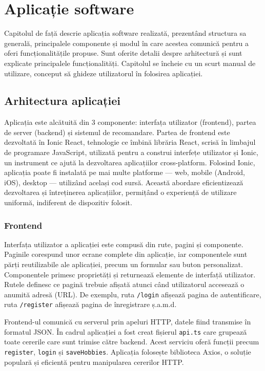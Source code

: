 \sloppy
\chapter{Aplicație software}
\label{chap:ch4}

\par
Capitolul de față descrie aplicația software realizată, prezentând structura sa generală, principalele componente și modul în care acestea comunică pentru a oferi funcționalitățile propuse.
Sunt oferite detalii despre arhitectură și sunt explicate principalele funcționalități. 
Capitolul se încheie cu un scurt manual de utilizare, conceput să ghideze utilizatorul în folosirea aplicației. 

\section{Arhitectura aplicației}
\label{sec:ch4sec1}

Aplicația este alcătuită din 3 componente: interfața utilizator (frontend), partea de server (backend) și sistemul de recomandare. 
Partea de frontend este dezvoltată în Ionic React\cite{ionicreactdocs}, tehnologie ce îmbină librăria React\cite{reactdocs}, scrisă în limbajul de programare JavaScript, 
utilizată pentru a construi interfețe utilizator și Ionic\cite{ionicdocs}, un instrument ce ajută la dezvoltarea aplicațiilor cross-platform. 
Folosind Ionic, aplicația poate fi instalată pe mai multe platforme --- web, mobile (Android, iOS), desktop --- utilizând același cod sursă. 
Această abordare eficientizează dezvoltarea și întreținerea aplicațiilor, permițând o experiență de utilizare uniformă, indiferent de dispozitiv folosit. 

\subsection{Frontend}
\label{subsec:ch4sec1sub1}
Interfața utilizator a aplicației este compusă din rute, pagini și componente. 
Paginile corespund unor ecrane complete din aplicație, iar componentele sunt părți reutilizabile ale aplicației, precum un formular sau buton personalizat.
Componentele primesc proprietăți și returnează elemente de interfață utilizator.
Rutele definesc ce pagină trebuie afișată atunci când utilizatorul accesează o anumită adresă (URL). 
De exemplu, ruta \texttt{/login} afișează pagina de autentificare, ruta \texttt{/register} afișează pagina de înregistrare ș.a.m.d.

\par
Frontend-ul comunică cu serverul prin apeluri HTTP, datele fiind transmise în formatul JSON.
În cadrul aplicației a fost creat fișierul \texttt{api.ts} care grupează toate cererile care sunt trimise către backend. 
Acest serviciu oferă funcții precum \texttt{register}, \texttt{login} și \texttt{saveHobbies}.
Aplicația folosește biblioteca Axios, o soluție populară și eficientă pentru manipularea cererilor HTTP.



